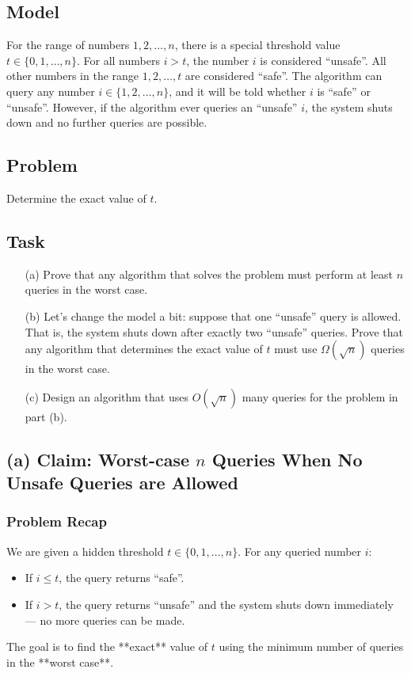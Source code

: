 \documentclass[12pt]{article}
\begin{document}
	\subsection*{Model}
	For the range of numbers \( 1, 2, \ldots, n \), there is a special threshold value \( t \in \{0, 1, \ldots, n\} \). For all numbers \( i > t \), the number \( i \) is considered ``unsafe''. All other numbers in the range \( 1, 2, \ldots, t \) are considered ``safe''. The algorithm can query any number \( i \in \{1, 2, \ldots, n\} \), and it will be told whether \( i \) is ``safe'' or ``unsafe''. However, if the algorithm ever queries an ``unsafe'' \( i \), the system shuts down and no further queries are possible.
	
	\subsection*{Problem}
	Determine the exact value of \( t \).
	
	\subsection*{Task}
	\begin{enumerate}
		\item[(a)] Prove that any algorithm that solves the problem must perform at least \( n \) queries in the worst case.
		
		\item[(b)] Let's change the model a bit: suppose that one ``unsafe'' query is allowed. That is, the system shuts down after exactly two ``unsafe'' queries. Prove that any algorithm that determines the exact value of \( t \) must use \( \Omega(\sqrt{n}) \) queries in the worst case.
		
		\item[(c)] Design an algorithm that uses \( O(\sqrt{n}) \) many queries for the problem in part (b).
	\end{enumerate}
	
	\subsection*{(a) Claim: Worst-case $n$ Queries When No Unsafe Queries are Allowed}
	
	\subsubsection*{Problem Recap}
	We are given a hidden threshold $t \in \{0, 1, \ldots, n\}$. For any queried number $i$:
	\begin{itemize}
		\item If $i \le t$, the query returns ``safe''.
		\item If $i > t$, the query returns ``unsafe'' and the system shuts down immediately — no more queries can be made.
	\end{itemize}
	The goal is to find the **exact** value of $t$ using the minimum number of queries in the **worst case**.
	
\end{document}
